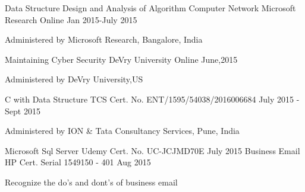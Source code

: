 \begin{cventries}
  \cventry
    {Data Structure \hspace{12cm}Design and Analysis of Algorithm \hspace{10cm} Computer Network}
     {Microsoft Research}
    {Online}
    {Jan 2015-July 2015}
    {
      \begin{cvitems}
        \item {Administered by Microsoft Research, Bangalore, India}
      \end{cvitems}
    }
    \cventry
    {Maintaining Cyber Security}
    {DeVry University}
    {Online}
    {June,2015 }
    {
      \begin{cvitems}
        \item {Administered by DeVry University,US}
      \end{cvitems}
    }
        \cventry
    {C with Data Structure}
    {TCS}
    {Cert. No. ENT/1595/54038/2016006684 }
    {July 2015 - Sept 2015 }
    {
      \begin{cvitems}
        \item {Administered by ION \& Tata Consultancy Services, Pune, India}
      \end{cvitems}
    }
      \cventry
    {Microsoft Sql Server}
    {Udemy}
    {Cert. No. UC-JCJMD70E }
    {July 2015}
    {
    }
      \cventry
    {Business Email}
    {HP}
    {Cert. Serial 1549150 - 401}
    {Aug 2015 }
    {
      \begin{cvitems}
       \item {Recognize the do's and dont's of business email}
      \end{cvitems}
    }
    

\end{cventries}
